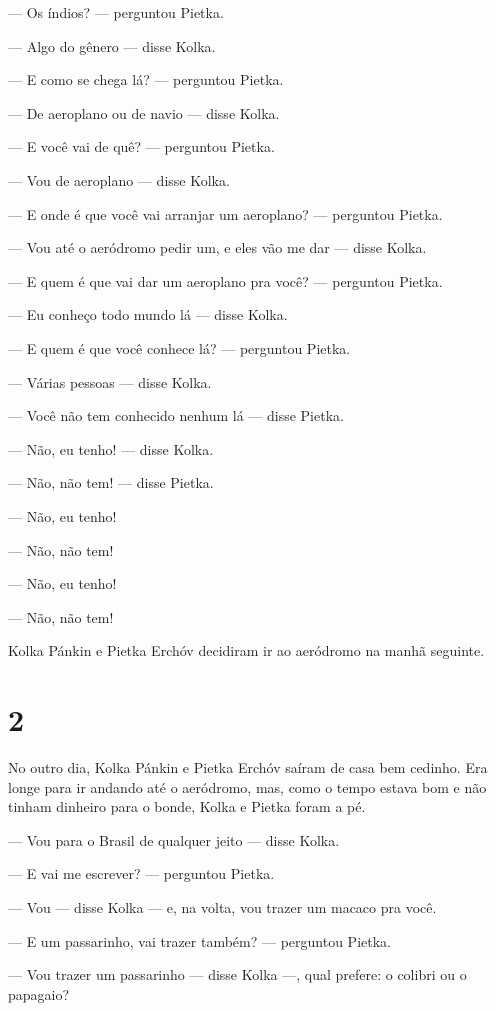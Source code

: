 --- Os índios? --- perguntou Pietka.

--- Algo do gênero --- disse Kolka.

--- E como se chega lá? --- perguntou Pietka.

--- De aeroplano ou de navio --- disse Kolka.

--- E você vai de quê? --- perguntou Pietka.

--- Vou de aeroplano --- disse Kolka.

--- E onde é que você vai arranjar um aeroplano? --- perguntou Pietka.

--- Vou até o aeródromo pedir um, e eles vão me dar --- disse Kolka.

--- E quem é que vai dar um aeroplano pra você? --- perguntou Pietka.

--- Eu conheço todo mundo lá --- disse Kolka.

--- E quem é que você conhece lá? --- perguntou Pietka.

--- Várias pessoas --- disse Kolka.

--- Você não tem conhecido nenhum lá --- disse Pietka.

--- Não, eu tenho! --- disse Kolka.

--- Não, não tem! --- disse Pietka.

--- Não, eu tenho!

--- Não, não tem!

--- Não, eu tenho!

--- Não, não tem!

Kolka Pánkin e Pietka Erchóv decidiram ir ao aeródromo na manhã
seguinte.

\section{2}

No outro dia, Kolka Pánkin e Pietka Erchóv saíram de casa bem
cedinho. Era longe para ir andando até o aeródromo, mas, como o tempo
estava bom e não tinham dinheiro para o bonde, Kolka e Pietka foram a
pé.

--- Vou para o Brasil de qualquer jeito --- disse Kolka.

--- E vai me escrever? --- perguntou Pietka.

--- Vou --- disse Kolka --- e, na volta, vou trazer um macaco pra você.

--- E um passarinho, vai trazer também? --- perguntou Pietka.

--- Vou trazer um passarinho --- disse Kolka ---, qual prefere: o
colibri ou o papagaio?

